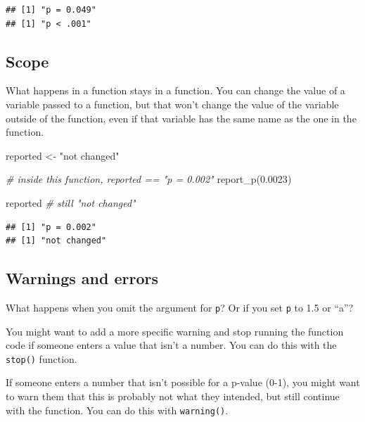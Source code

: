 \documentclass[
  oneside]{book}
\newenvironment{Shaded}{\begin{snugshade}}{\end{snugshade}}
\newcommand{\CommentTok}[1]{\textcolor[rgb]{0.56,0.35,0.01}{\textit{#1}}}
\newcommand{\FloatTok}[1]{\textcolor[rgb]{0.00,0.00,0.81}{#1}}
\newcommand{\FunctionTok}[1]{\textcolor[rgb]{0.00,0.00,0.00}{#1}}
\newcommand{\NormalTok}[1]{#1}
\newcommand{\OtherTok}[1]{\textcolor[rgb]{0.56,0.35,0.01}{#1}}
\newcommand{\StringTok}[1]{\textcolor[rgb]{0.31,0.60,0.02}{#1}}
\begin{document}
\begin{verbatim}
## [1] "p = 0.049"
## [1] "p < .001"
\end{verbatim}

\hypertarget{scope}{%
\subsection{Scope}\label{scope}}

What happens in a function stays in a function. You can change the value of a variable passed to a function, but that won't change the value of the variable outside of the function, even if that variable has the same name as the one in the function.

\begin{Shaded}
\begin{Highlighting}[]
\NormalTok{reported }\OtherTok{\textless{}{-}} \StringTok{"not changed"}

\CommentTok{\# inside this function, reported == "p = 0.002"}
\FunctionTok{report\_p}\NormalTok{(}\FloatTok{0.0023}\NormalTok{) }

\NormalTok{reported }\CommentTok{\# still "not changed"}
\end{Highlighting}
\end{Shaded}

\begin{verbatim}
## [1] "p = 0.002"
## [1] "not changed"
\end{verbatim}

\hypertarget{warnings-errors}{%
\subsection{Warnings and errors}\label{warnings-errors}}

\begin{try}

What happens when you omit the argument for \texttt{p}? Or if you set \texttt{p} to 1.5 or ``a''?

\end{try}

You might want to add a more specific warning and stop running the function code if someone enters a value that isn't a number. You can do this with the \texttt{stop()} function.

If someone enters a number that isn't possible for a p-value (0-1), you might want to warn them that this is probably not what they intended, but still continue with the function. You can do this with \texttt{warning()}.
\end{document}
